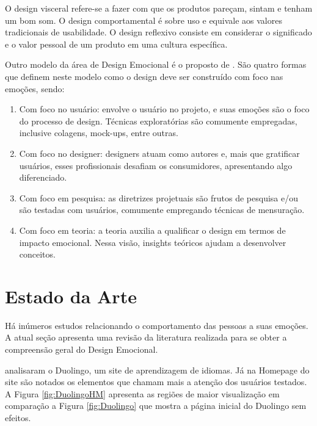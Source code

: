 \documentclass[12pt]{article}
\begin{document}
O design visceral refere-se a fazer com que os produtos pareçam, sintam e tenham um bom som. O design comportamental é sobre uso e equivale aos valores tradicionais de usabilidade. O design reflexivo consiste em considerar o significado e o valor pessoal de um produto em uma cultura específica.

Outro modelo da área de Design Emocional é o proposto de . São quatro formas que definem neste modelo como o design deve ser construído com foco nas emoções, sendo: 

\begin{enumerate}[label=(\alph*)]
\item Com foco no usuário: envolve o usuário no projeto, e suas emoções são o foco do processo de design. Técnicas exploratórias são comumente empregadas, inclusive colagens, mock-ups, entre outras. 
\item Com foco no designer: designers atuam como autores e, mais que gratificar usuários, esses profissionais desafiam os consumidores, apresentando algo diferenciado. 
\item Com foco em pesquisa: as diretrizes projetuais são frutos de pesquisa e/ou são testadas com usuários, comumente empregando técnicas de mensuração. 
\item Com foco em teoria: a teoria auxilia a qualificar o design em termos de impacto emocional. Nessa visão, insights teóricos ajudam a desenvolver conceitos.
\end{enumerate}

\newpage

\section{Estado da Arte}\label{secao:trabalhos}

Há inúmeros estudos relacionando o comportamento das pessoas a suas emoções. A atual seção apresenta uma revisão da literatura realizada para se obter a compreensão geral do Design Emocional.

 analisaram o Duolingo, um site de aprendizagem de idiomas. Já na Homepage do site são notados os elementos que chamam mais a atenção dos usuários testados. A Figura \ref{fig:DuolingoHM} apresenta as regiões de maior visualização em comparação a Figura \ref{fig:Duolingo} que mostra a página inicial do Duolingo sem efeitos. 
\end{document}

